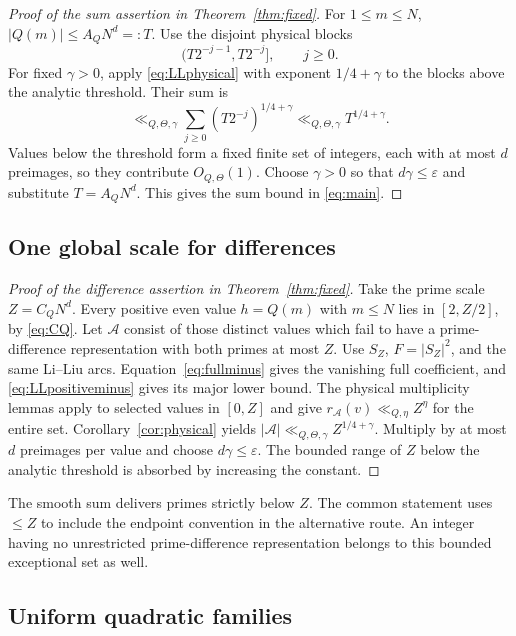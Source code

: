 \documentclass[11pt]{article}
\theoremstyle{definition}
\theoremstyle{remark}
\numberwithin{equation}{section}
\newcommand{\eps}{\varepsilon}
\newcommand{\A}{\mathcal A}
\begin{document}
\begin{proof}[Proof of the sum assertion in Theorem~\ref{thm:fixed}]
For $1\le m\le N$, $|Q(m)|\le A_QN^d=:T$.
Use the disjoint physical blocks
\begin{equation}\label{eq:anchoredblocks}
                         (T2^{-j-1},T2^{-j}],\qquad j\ge0.
\end{equation}
For fixed $\gamma>0$, apply \eqref{eq:LLphysical} with exponent
$1/4+\gamma$ to the blocks above the analytic threshold. Their
sum is
\[
 \ll_{Q,\Theta,\gamma}\sum_{j\ge0}(T2^{-j})^{1/4+\gamma}
               \ll_{Q,\Theta,\gamma}T^{1/4+\gamma}.
\]
Values below the threshold form a fixed finite set of integers,
each with at most $d$ preimages, so they contribute $O_{Q,\Theta}(1)$.
Choose $\gamma>0$ so that $d\gamma\le\eps$ and substitute $T=A_QN^d$.
This gives the sum bound in \eqref{eq:main}.
\end{proof}

\subsection{One global scale for differences}

\begin{proof}[Proof of the difference assertion in Theorem~\ref{thm:fixed}]
Take the prime scale $Z=C_QN^d$. Every positive even value
$h=Q(m)$ with $m\le N$ lies in $[2,Z/2]$, by \eqref{eq:CQ}.
Let $\A$ consist of those distinct values which fail to have a
prime-difference representation with both primes at most $Z$.
Use $S_Z$, $F=|S_Z|^2$, and the same Li--Liu arcs.
Equation~\eqref{eq:fullminus} gives the vanishing full coefficient,
and \eqref{eq:LLpositiveminus} gives its major lower bound.
The physical multiplicity lemmas apply to selected values in
$[0,Z]$ and give $r_\A(v)\ll_{Q,\eta}Z^\eta$ for the entire set.
Corollary~\ref{cor:physical} yields
$|\A|\ll_{Q,\Theta,\gamma}Z^{1/4+\gamma}$.
Multiply by at most $d$ preimages per value and choose
$d\gamma\le\eps$. The bounded range of $Z$ below the analytic
threshold is absorbed by increasing the constant.
\end{proof}

The smooth sum delivers primes strictly below $Z$. The common
statement uses $\le Z$ to include the endpoint convention in the
alternative route. An integer having no unrestricted prime-difference
representation belongs to this bounded exceptional set as well.

\subsection{Uniform quadratic families}
\end{document}
